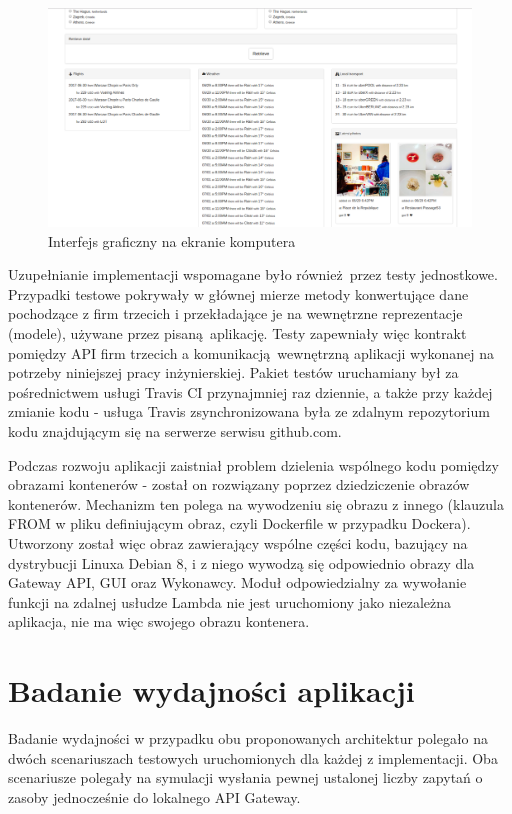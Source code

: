 \documentclass[oneside]{mgr}
\begin{document}
\begin{figure}
	\centering
	\includegraphics[width=15cm]{2017-06-2918:53:18}
	\caption{Interfejs graficzny na ekranie komputera}
	\label{fig:guiBootstrapPC}
\end{figure}

Uzupełnianie implementacji wspomagane było również przez testy jednostkowe. Przypadki testowe pokrywały w głównej mierze metody konwertujące dane pochodzące z firm trzecich i przekładające je na wewnętrzne reprezentacje (modele), używane przez pisaną aplikację. Testy zapewniały więc kontrakt pomiędzy API firm trzecich a komunikacją wewnętrzną aplikacji wykonanej na potrzeby niniejszej pracy inżynierskiej. Pakiet testów uruchamiany był za pośrednictwem usługi Travis CI przynajmniej raz dziennie, a także przy każdej zmianie kodu - usługa Travis zsynchronizowana była ze zdalnym repozytorium kodu znajdującym się na serwerze serwisu github.com.

Podczas rozwoju aplikacji zaistniał problem dzielenia wspólnego kodu pomiędzy obrazami kontenerów - został on rozwiązany poprzez dziedziczenie obrazów kontenerów. Mechanizm ten polega na wywodzeniu się obrazu z innego (klauzula FROM w pliku definiującym obraz, czyli Dockerfile w przypadku Dockera). Utworzony został więc obraz zawierający wspólne części kodu, bazujący na dystrybucji Linuxa Debian 8, i z niego wywodzą się odpowiednio obrazy dla Gateway API, GUI oraz Wykonawcy. Moduł odpowiedzialny za wywołanie funkcji na zdalnej usłudze Lambda nie jest uruchomiony jako niezależna aplikacja, nie ma więc swojego obrazu kontenera.

\chapter{Badanie wydajności aplikacji}
Badanie wydajności w przypadku obu proponowanych architektur polegało na dwóch scenariuszach testowych uruchomionych dla każdej z implementacji. Oba scenariusze polegały na symulacji wysłania pewnej ustalonej liczby zapytań o zasoby jednocześnie do lokalnego API Gateway.
\end{document}
